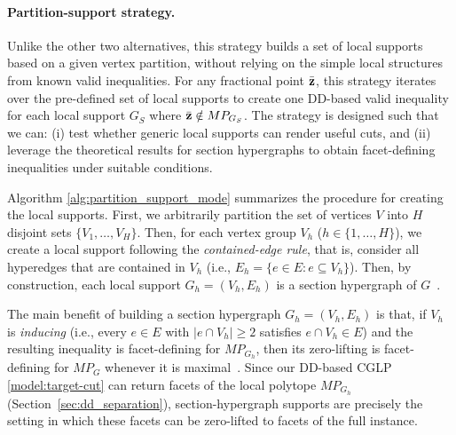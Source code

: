 

\paragraph{Partition-support strategy.} Unlike the other two alternatives, this strategy builds a set of local supports based on a given vertex partition, without relying on the simple local structures from known valid inequalities. For any fractional point $\bar {\mathbf{z}}$, this strategy iterates over the pre-defined set of local supports to create one DD-based valid inequality for each local support $G_S$ where $\bar {\mathbf{z}} \notin MP_{G_S}$. The strategy is designed such that we can: (i) test whether generic local supports can render useful cuts, and (ii) leverage the theoretical results for section hypergraphs to obtain facet-defining inequalities under suitable conditions. 

Algorithm \ref{alg:partition_support_mode} summarizes the procedure for creating the local supports. First, we arbitrarily partition the set of vertices $V$ into $H$ disjoint sets $\{V_1,\ldots,V_H\}$. Then, for each vertex group $V_h$ ($h \in \{1,\ldots,H\}$), we create a local support following the \emph{contained-edge rule}, that is, consider all hyperedges that are contained in $V_h$ (i.e., $E_h=\{e\in E:e\subseteq V_h\}$). Then, by construction, each local support $G_h=(V_h,E_h)$ is a
section hypergraph of $G$~\cite{del2017polyhedral}. 

The main benefit of building a section hypergraph $G_h=(V_h,E_h)$ is that, if $V_h$ is \emph{inducing} (i.e., every $e\in E$ with $|e\cap V_h|\ge 2$ satisfies $e\cap V_h\in E$) and the resulting inequality is facet-defining for $MP_{G_h}$, then its zero-lifting is facet-defining for $MP_G$ whenever it is maximal~\cite{del2017polyhedral}. Since our DD-based CGLP \eqref{model:target-cut} can return facets of the local polytope $MP_{G_h}$ (Section~\ref{sec:dd_separation}), section-hypergraph supports are precisely the setting in which these facets can be zero-lifted to facets of the full instance.

